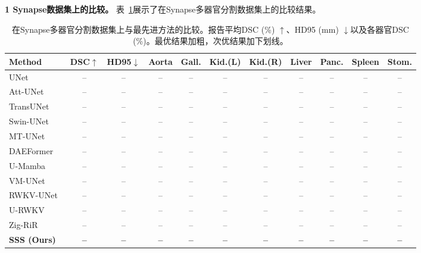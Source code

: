 \documentclass[conference]{IEEEtran}   %
\begin{document}
\textbf{1 Synapse数据集上的比较。}
表~\ref{tab:synapse}展示了在Synapse多器官分割数据集上的比较结果。

\begin{table}[t]
\centering
\caption{在Synapse多器官分割数据集上与最先进方法的比较。报告平均DSC (\%) $\uparrow$、HD95 (mm) $\downarrow$以及各器官DSC (\%)。最优结果加粗，次优结果加下划线。}
\label{tab:synapse}
\footnotesize
\begin{tabular}{l cc cccccccc}
\toprule
Method & DSC$\uparrow$ & HD95$\downarrow$ & Aorta & Gall. & Kid.(L) & Kid.(R) & Liver & Panc. & Spleen & Stom. \\
\midrule
UNet~\cite{Unet}              & --    & --    & --    & --    & --    & --    & --    & --    & --    & --    \\
Att-UNet~\cite{attetion-unet} & --    & --    & --    & --    & --    & --    & --    & --    & --    & --    \\
\midrule
TransUNet~\cite{transunet}    & --    & --    & --    & --    & --    & --    & --    & --    & --    & --    \\
Swin-UNet~\cite{swinunet}     & --    & --    & --    & --    & --    & --    & --    & --    & --    & --    \\
MT-UNet~\cite{mtUNet}         & --    & --    & --    & --    & --    & --    & --    & --    & --    & --    \\
DAEFormer~\cite{daeformer}    & --    & --    & --    & --    & --    & --    & --    & --    & --    & --    \\
\midrule
U-Mamba~\cite{umamba}         & --    & --    & --    & --    & --    & --    & --    & --    & --    & --    \\
VM-UNet~\cite{vmunet}         & --    & --    & --    & --    & --    & --    & --    & --    & --    & --    \\
\midrule
RWKV-UNet~\cite{RWKV-UNet}   & --    & --    & --    & --    & --    & --    & --    & --    & --    & --    \\
U-RWKV~\cite{urwkv}          & --    & --    & --    & --    & --    & --    & --    & --    & --    & --    \\
Zig-RiR~\cite{zigrir}        & --    & --    & --    & --    & --    & --    & --    & --    & --    & --    \\
\midrule
\textbf{SSS (Ours)}          & \textbf{--} & \textbf{--} & \textbf{--} & \textbf{--} & \textbf{--} & \textbf{--} & \textbf{--} & \textbf{--} & \textbf{--} & \textbf{--} \\
\bottomrule
\end{tabular}
\end{table}
\end{document}
